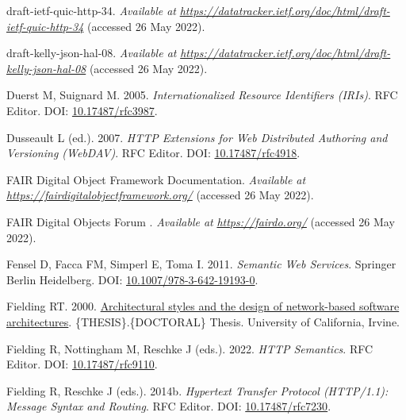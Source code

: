 \begin{CSLReferences}{1}{0}
\leavevmode{}%
draft-ietf-quic-http-34. \emph{Available at} \href{https://datatracker.ietf.org/doc/html/draft-ietf-quic-http-34}{\emph{https://datatracker.ietf.org/doc/html/draft-ietf-quic-http-34}} (accessed 26 May 2022).

\leavevmode{}%
draft-kelly-json-hal-08. \emph{Available at} \href{https://datatracker.ietf.org/doc/html/draft-kelly-json-hal-08}{\emph{https://datatracker.ietf.org/doc/html/draft-kelly-json-hal-08}} (accessed 26 May 2022).

\leavevmode{}%
Duerst M, Suignard M. 2005. \emph{Internationalized Resource Identifiers (IRIs)}. RFC Editor. DOI: \href{https://doi.org/10.17487/rfc3987}{10.17487/rfc3987}.

\leavevmode{}%
Dusseault L (ed.). 2007. \emph{HTTP Extensions for Web Distributed Authoring and Versioning (WebDAV)}. RFC Editor. DOI: \href{https://doi.org/10.17487/rfc4918}{10.17487/rfc4918}.

\leavevmode{}%
FAIR Digital Object Framework Documentation. \emph{Available at} \href{https://fairdigitalobjectframework.org/}{\emph{https://fairdigitalobjectframework.org/}} (accessed 26 May 2022).

\leavevmode{}%
FAIR Digital Objects Forum \textbar. \emph{Available at} \href{https://fairdo.org/}{\emph{https://fairdo.org/}} (accessed 26 May 2022).

\leavevmode{}%
Fensel D, Facca FM, Simperl E, Toma I. 2011. \emph{Semantic Web Services}. Springer Berlin Heidelberg. DOI: \href{https://doi.org/10.1007/978-3-642-19193-0}{10.1007/978-3-642-19193-0}.

\leavevmode{}%
Fielding RT. 2000. \href{https://www.ics.uci.edu//~fielding/pubs/dissertation/top.htm}{Architectural styles and the design of network-based software architectures}. \{THESIS\}.\{DOCTORAL\} Thesis. University of California, Irvine.

\leavevmode{}%
Fielding R, Nottingham M, Reschke J (eds.). 2022. \emph{HTTP Semantics}. RFC Editor. DOI: \href{https://doi.org/10.17487/rfc9110}{10.17487/rfc9110}.

\leavevmode{}%
Fielding R, Reschke J (eds.). 2014b. \emph{Hypertext Transfer Protocol (HTTP/1.1): Message Syntax and Routing}. RFC Editor. DOI: \href{https://doi.org/10.17487/rfc7230}{10.17487/rfc7230}.


\end{CSLReferences}
